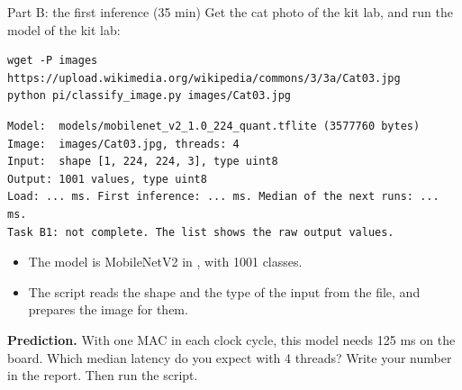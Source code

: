 \begin{frame}[fragile]{Part B: the first inference (35 min)}
  \small
  Get the cat photo of the kit lab, and run the model of the kit lab:
\begin{lstlisting}[style=shell]
wget -P images https://upload.wikimedia.org/wikipedia/commons/3/3a/Cat03.jpg
python pi/classify_image.py images/Cat03.jpg
\end{lstlisting}
\begin{lstlisting}
Model:  models/mobilenet_v2_1.0_224_quant.tflite (3577760 bytes)
Image:  images/Cat03.jpg, threads: 4
Input:  shape [1, 224, 224, 3], type uint8
Output: 1001 values, type uint8
Load: ... ms. First inference: ... ms. Median of the next runs: ... ms.
Task B1: not complete. The list shows the raw output values.
\end{lstlisting}
  \begin{itemize}
    \item The model is MobileNetV2 in , with 1001 classes.
    \item The script reads the shape and the type of the input from the
          file, and prepares the image for them.
  \end{itemize}
  \begin{exerciseblock}
    \textbf{Prediction.} With one MAC in each clock cycle, this model needs
    125 ms on the board. Which median latency do you expect with 4 threads?
    Write your number in the report. Then run the script.
  \end{exerciseblock}
\end{frame}

